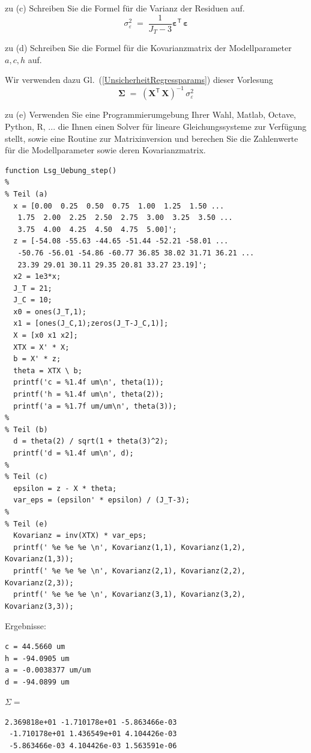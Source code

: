 zu (c) Schreiben Sie die Formel für die Varianz der Residuen auf.
$$
\sigma_\varepsilon^2 \; = \; \frac{1}{J_T - 3} \boldsymbol \varepsilon^\mathsf{T} \, \boldsymbol \varepsilon
$$

zu (d) Schreiben Sie die Formel für die Kovarianzmatrix der Modellparameter
$a, c, h$ auf.

Wir verwenden dazu Gl.~(\ref{UnsicherheitRegressparams}) dieser Vorlesung
\begin{equation}
\boldsymbol \Sigma \; = \; \left( \mathbf{X}^\mathsf{T}  \, \mathbf{X} \right)^{-1} \, \sigma_\varepsilon^2
\end{equation}

zu (e) Verwenden Sie eine Programmierumgebung Ihrer Wahl, Matlab, Octave, Python, R, ...
die Ihnen einen Solver für lineare Gleichungssysteme zur Verfügung stellt, sowie
eine Routine zur Matrixinversion und berechen Sie die Zahlenwerte für die Modellparameter
sowie deren Kovarianzmatrix.

\begin{lstlisting}[style=Matlab]
function Lsg_Uebung_step()
%
% Teil (a)
  x = [0.00  0.25  0.50  0.75  1.00  1.25  1.50 ...
   1.75  2.00  2.25  2.50  2.75  3.00  3.25  3.50 ...
   3.75  4.00  4.25  4.50  4.75  5.00]';
  z = [-54.08 -55.63 -44.65 -51.44 -52.21 -58.01 ...
   -50.76 -56.01 -54.86 -60.77 36.85 38.02 31.71 36.21 ...
   23.39 29.01 30.11 29.35 20.81 33.27 23.19]';
  x2 = 1e3*x;
  J_T = 21;
  J_C = 10;
  x0 = ones(J_T,1);
  x1 = [ones(J_C,1);zeros(J_T-J_C,1)];
  X = [x0 x1 x2];
  XTX = X' * X;
  b = X' * z;
  theta = XTX \ b;
  printf('c = %1.4f um\n', theta(1));
  printf('h = %1.4f um\n', theta(2));
  printf('a = %1.7f um/um\n', theta(3));
%
% Teil (b)
  d = theta(2) / sqrt(1 + theta(3)^2);
  printf('d = %1.4f um\n', d);
%
% Teil (c)
  epsilon = z - X * theta;
  var_eps = (epsilon' * epsilon) / (J_T-3);
%
% Teil (e)
  Kovarianz = inv(XTX) * var_eps;
  printf(' %e %e %e \n', Kovarianz(1,1), Kovarianz(1,2), Kovarianz(1,3));
  printf(' %e %e %e \n', Kovarianz(2,1), Kovarianz(2,2), Kovarianz(2,3));
  printf(' %e %e %e \n', Kovarianz(3,1), Kovarianz(3,2), Kovarianz(3,3));
\end{lstlisting}

Ergebnisse:
\begin{verbatim}
c = 44.5660 um
h = -94.0905 um
a = -0.0038377 um/um
d = -94.0899 um
\end{verbatim}

$\Sigma =$
\begin{verbatim}
2.369818e+01 -1.710178e+01 -5.863466e-03
 -1.710178e+01 1.436549e+01 4.104426e-03
 -5.863466e-03 4.104426e-03 1.563591e-06
\end{verbatim}


